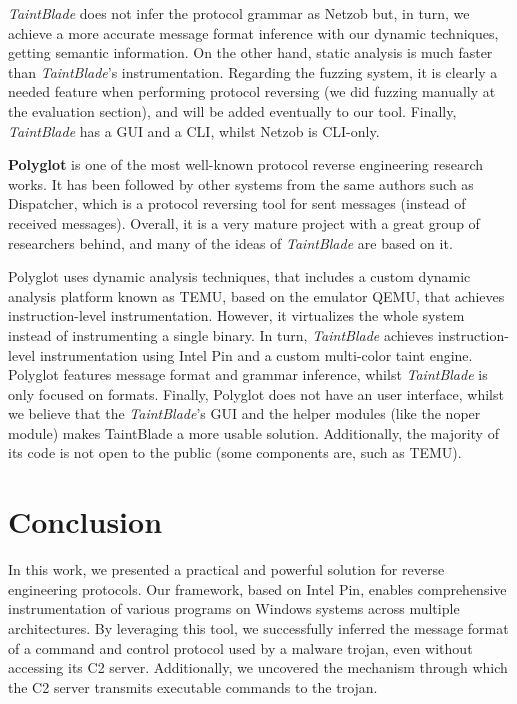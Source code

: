 \documentclass[conference]{IEEEtran}
\begin{document}
\textit{TaintBlade} does not infer the protocol grammar as Netzob but, in turn, we achieve a more accurate message 
format inference with our dynamic techniques, getting semantic information. On the other hand, static analysis is
much faster than \textit{TaintBlade}'s instrumentation. Regarding the fuzzing system, it is clearly a needed feature
when performing protocol reversing (we did fuzzing manually at the evaluation section), and will be added eventually 
to our tool. Finally, \textit{TaintBlade} has a GUI and a CLI, whilst Netzob is CLI-only.

\textbf{Polyglot} \cite{polyglot_caballero} is one of the most well-known protocol reverse engineering research works. 
It has been followed by other systems from the same authors such as Dispatcher\cite{dispatcher_paper}, which is a 
protocol reversing tool for sent messages (instead of received messages). Overall, it is a very mature project with 
a great group of researchers behind, and many of the ideas of \textit{TaintBlade} are based on it.

Polyglot uses dynamic analysis techniques, that includes a custom dynamic analysis platform known as TEMU, based on the 
emulator QEMU\cite{qemu}, that achieves instruction-level instrumentation. 
However, it virtualizes the whole system instead of instrumenting a single binary. In turn, \textit{TaintBlade}
achieves instruction-level instrumentation using Intel Pin and a custom multi-color taint engine.
Polyglot features message format and grammar inference, whilst \textit{TaintBlade} is only focused on formats.
Finally, Polyglot does not have an user interface, whilst we believe that the \textit{TaintBlade}'s GUI and the 
helper modules (like the noper module) makes TaintBlade a more usable solution. Additionally, the majority of 
its code is not open to the public (some components are, such as TEMU).

\section{Conclusion}
In this work, we presented a practical and powerful solution for reverse engineering protocols. Our framework, based on Intel Pin,  
enables comprehensive instrumentation of various programs on Windows systems across multiple architectures. By leveraging this tool, 
we successfully inferred the message format of a command and control protocol used by a malware trojan, even without accessing its C2 server.
Additionally, we uncovered the mechanism through which the C2 server transmits executable commands to the trojan.
\end{document}
